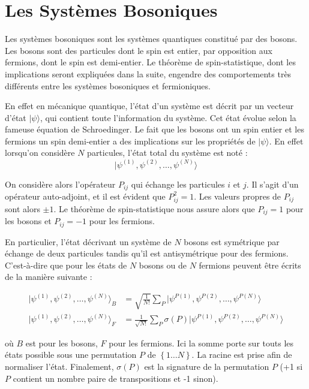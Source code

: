 \documentclass[11pt]{article}
\theoremstyle{definition}
\theoremstyle{remark}
\begin{document}
\section{Les Systèmes Bosoniques}\label{sec:bosons}

Les systèmes bosoniques sont les systèmes quantiques constitué par des bosons. Les bosons sont des particules dont le spin est entier, par opposition aux fermions, dont le spin est demi-entier. Le théorème de spin-statistique, dont les implications seront expliquées dans la suite, engendre des comportements très différents entre les systèmes bosoniques et fermioniques.

En effet en mécanique quantique, l'état d'un système est décrit par un vecteur d'état $|\psi \rangle$, qui contient toute l'information du système. Cet état évolue selon la fameuse équation de Schroedinger. Le fait que les bosons ont un spin entier et les fermions un spin demi-entier a des implications sur les propriétés de $| \psi \rangle$. En effet lorsqu'on considère $N$ particules, l'état total du système est noté :
\begin{equation}
|\psi^{(1)},\psi^{(2)},\ldots,\psi^{(N)}\rangle
\end{equation}

On considère alors l'opérateur $P_{ij}$ qui échange les particules $i$ et $j$. Il s'agit d'un opérateur auto-adjoint, et il est évident que $P_{ij}^2=1$. Les valeurs propres de $P_{ij}$ sont alors $\pm 1$. Le théorème de spin-statistique nous assure alors que $P_{ij}=1$ pour les bosons et $P_{ij}=-1$ pour les fermions.

En particulier, l’état décrivant un système de $N$ bosons est symétrique par échange de deux particules tandis qu'il est antisymétrique pour des fermions. C'est-à-dire que pour les états de $N$ bosons ou de $N$ fermions peuvent être écrits de la manière suivante : 

\begin{align} 
\label{symetrie_boson_fermion}
|\psi^{(1)},\psi^{(2)},\ldots,\psi^{(N)}\rangle_B &= \sqrt{\frac{1}{N!}} \sum_P |\psi^{P(1)},\psi^{P(2)},\ldots,\psi^{P(N)}\rangle \\
|\psi^{(1)},\psi^{(2)},\ldots,\psi^{(N)}\rangle_F &= \frac{1}{\sqrt{N!}} \sum_P \sigma (P) |\psi^{P(1)},\psi^{P(2)},\ldots,\psi^{P(N)}\rangle
\end{align}

où $B$ est pour les bosons, $F$ pour les fermions. Ici la somme porte sur touts les états possible sous une permutation $P$ de $\left\lbrace 1\ldots N\right\rbrace$. La racine est prise afin de normaliser l'état. Finalement, $\sigma (P)$ est la signature de la permutation $P$ (+1 si $P$ contient un nombre paire de transpositions et -1 sinon). 
\end{document}
